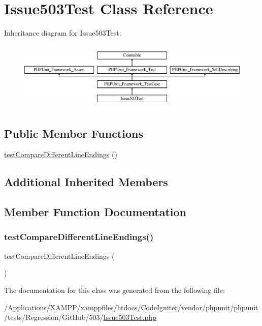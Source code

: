 \hypertarget{class_issue503_test}{}\section{Issue503\+Test Class Reference}
\label{class_issue503_test}
Inheritance diagram for Issue503\+Test\+:\begin{figure}[H]
\begin{center}
\leavevmode
\includegraphics[height=3.303835cm]{class_issue503_test}
\end{center}
\end{figure}
\subsection*{Public Member Functions}
\begin{DoxyCompactItemize}
\item 
\mbox{\hyperlink{class_issue503_test_abeff9905586cb27e4137d8445c444290}{test\+Compare\+Different\+Line\+Endings}} ()
\end{DoxyCompactItemize}
\subsection*{Additional Inherited Members}


\subsection{Member Function Documentation}
\mbox{\label{class_issue503_test_abeff9905586cb27e4137d8445c444290}} 
\subsubsection{\texorpdfstring{test\+Compare\+Different\+Line\+Endings()}{testCompareDifferentLineEndings()}}
{\footnotesize\ttfamily test\+Compare\+Different\+Line\+Endings (\begin{DoxyParamCaption}{ }\end{DoxyParamCaption})}



The documentation for this class was generated from the following file\+:\begin{DoxyCompactItemize}
\item 
/\+Applications/\+X\+A\+M\+P\+P/xamppfiles/htdocs/\+Code\+Igniter/vendor/phpunit/phpunit/tests/\+Regression/\+Git\+Hub/503/\mbox{\hyperlink{_issue503_test_8php}{Issue503\+Test.\+php}}\end{DoxyCompactItemize}
